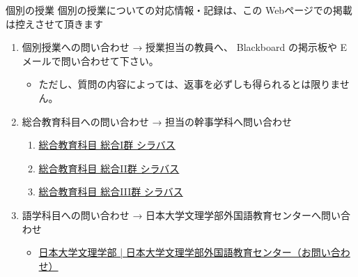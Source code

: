 \documentclass[a4j,10pt]{jsarticle}
\def\lthtmlcheckvsize{\ifdim\ht\sizebox<\vsize 
  \ifdim\wd\sizebox<\hsize\expandafter\hfill\fi \expandafter\vfill
  \else\expandafter\vss\fi}%
\begin{document}
{\newpage\clearpage
{}%
\begin{frame}[label={sec:org581a33c},fragile]{個別の授業}
個別の授業についての対応情報・記録は、この Webページでの掲載は控えさせて頂きます
\par
\begin{enumerate}
\item 個別授業への問い合わせ → 授業担当の教員へ、 Blackboard の掲示板や Eメールで問い合わせて下さい。
\begin{itemize}
\item ただし、質問の内容によっては、返事を必ずしも得られるとは限りません。
\end{itemize}
\par
\item 総合教育科目への問い合わせ → 担当の幹事学科へ問い合わせ
\begin{enumerate}
\item \href{https://syllabus.chs.nihon-u.ac.jp/op/list1\_1.html}{総合教育科目 総合I群 シラバス}
\item \href{https://syllabus.chs.nihon-u.ac.jp/op/list1\_2.html}{総合教育科目 総合II群 シラバス}
\item \href{https://syllabus.chs.nihon-u.ac.jp/op/list1\_3.html}{総合教育科目 総合III群 シラバス}
\end{enumerate}
\par
\item 語学科目への問い合わせ → 日本大学文理学部外国語教育センターへ問い合わせ
\begin{itemize}
\item \href{https://www.chs.nihon-u.ac.jp/contact/flec\_form/}{日本大学文理学部 | 日本大学文理学部外国語教育センター（お問い合わせ）}
\end{itemize}
\end{enumerate}
\end{frame}%
\lthtmlfigureZ
\lthtmlcheckvsize\clearpage}
\end{document}
